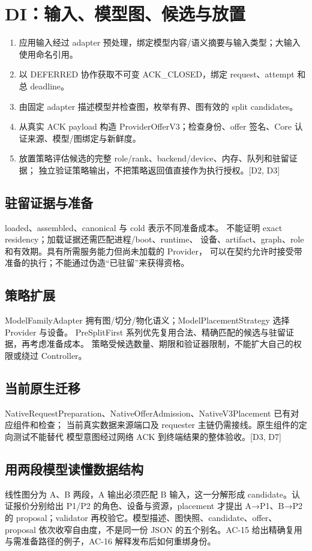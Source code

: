 \newpage

\section{DI：输入、模型图、候选与放置}
\begin{enumerate}
\item 应用输入经过 adapter 预处理，绑定模型内容/语义摘要与输入类型；大输入使用命名引用。
\item 以 DEFERRED 协作获取不可变 ACK\_CLOSED，绑定 request、attempt 和总 deadline。
\item 由固定 adapter 描述模型并检查图，枚举有界、图有效的 split candidates。
\item 从真实 ACK payload 构造 ProviderOfferV3；检查身份、offer 签名、Core 认证来源、模型/图绑定与新鲜度。
\item 放置策略评估候选的完整 role/rank、backend/device、内存、队列和驻留证据；
独立验证策略输出，不把策略返回值直接作为执行授权。[D2, D3]
\end{enumerate}

\subsection{驻留证据与准备}
loaded、assembled、canonical 与 cold 表示不同准备成本。
 不能证明 exact residency；加载证据还需匹配进程/boot、runtime、
设备、artifact、graph、role 和有效期。具有所需服务能力但尚未加载的 Provider，
可以在契约允许时接受带准备的执行；不能通过伪造“已驻留”来获得资格。

\subsection{策略扩展}
ModelFamilyAdapter 拥有图/切分/物化语义；ModelPlacementStrategy 选择 Provider 与设备。
PreSplitFirst 系列优先复用合法、精确匹配的候选与驻留证据，再考虑准备成本。
策略受候选数量、期限和验证器限制，不能扩大自己的权限或绕过 Controller。

\subsection{当前原生迁移}
NativeRequestPreparation、NativeOfferAdmission、NativeV3Placement 已有对应组件和检查；
当前真实数据来源端口及 requester 主链仍需接线。原生组件的定向测试不能替代
模型意图经过网络 ACK 到终端结果的整体验收。[D3, D7]


\subsection{用两段模型读懂数据结构}
线性图分为 A、B 两段，A 输出必须匹配 B 输入，这一分解形成 candidate。认证报价分别给出 P1/P2 的角色、设备与资源，placement 才提出 A→P1、B→P2 的 proposal；validator 再校验它。模型描述、图快照、candidate、offer、proposal 依次收窄自由度，不是同一份 JSON 的五个别名。AC-15 给出精确复用与需准备路径的例子，AC-16 解释发布后如何重绑身份。

